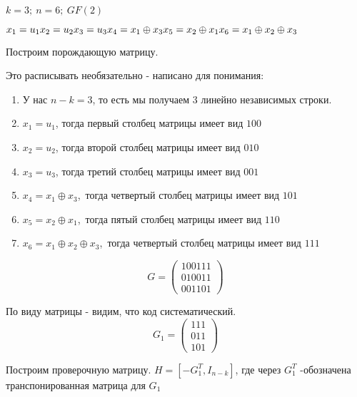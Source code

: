 \documentclass[../main.tex]{subfiles}
\begin{document}
\noindent
$k = 3;\ n = 6;\ GF(2)$ 

\noindent
$
x_1=u_1\newline
x_2=u_2\newline
x_3=u_3\newline
x_4=x_1\oplus x_3\newline
x_5=x_2\oplus x_1\newline
x_6=x_1\oplus x_2\oplus x_3
$

Построим порождающую матрицу. 

Это расписывать необязательно - написано для понимания:
\begin{enumerate}
    \item У нас $n-k = 3$, то есть мы получаем 3 линейно независимых строки.
    \item $x_1=u_1$, тогда первый столбец матрицы имеет вид $100$
    \item $x_2=u_2$, тогда второй столбец матрицы имеет вид $010$
    \item $x_3=u_3$, тогда третий столбец матрицы имеет вид $001$
    \item $x_4=x_1\oplus x_3$,\ тогда четвертый столбец матрицы имеет вид $101$
    \item $x_5=x_2\oplus x_1$,\ тогда пятый столбец матрицы имеет вид $110$ 
    \item $x_6=x_1\oplus x_2\oplus x_3$,\ тогда четвертый столбец матрицы имеет вид $111$
\end{enumerate}

\begin{equation*}
    G = \left( 
    \begin{array}{cccccc}
         100111  \\
         010011  \\
         001101
    \end{array}
    \right)
\end{equation*} 

По виду матрицы - видим, что код систематический. 
\begin{equation*}
    G_1 = \left( 
    \begin{array}{ccc}
         111  \\
         011  \\
         101
    \end{array}
    \right)
\end{equation*} 

Построим проверочную матрицу. \newline
$H=[-G^{T}_{1},I_{n-k}]$, где через $G^{T}_{1}$ -обозначена транспонированная матрица для $G_1$
\end{document}
